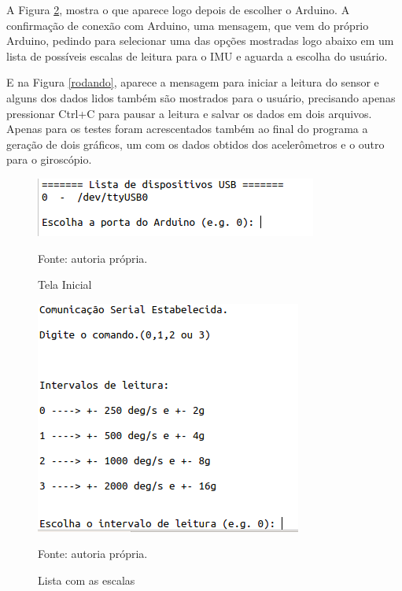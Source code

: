	A Figura \ref{lista_ranges}, mostra o que aparece logo depois de escolher o Arduino. A confirmação de conexão com Arduino, uma mensagem, que vem do próprio Arduino, pedindo para selecionar uma das opções mostradas logo abaixo em um lista de possíveis escalas de leitura para o IMU e aguarda a escolha do usuário.
	
	E na Figura \ref{rodando}, aparece a mensagem para iniciar a leitura do sensor e alguns dos dados lidos também são mostrados para o usuário, precisando apenas pressionar Ctrl+C para pausar a leitura e salvar os dados em dois arquivos. Apenas para os testes foram acrescentados também ao final do programa a geração de dois gráficos, um com os dados obtidos dos acelerômetros e o outro para o giroscópio. 
	 	
	 	\begin{figure}[h]
	 		\centering
	 		\includegraphics[keepaspectratio=true,scale=0.6]{figuras/tela_inicial.png}
	 		\caption{Tela Inicial}
	 		Fonte: autoria própria. 
	 		\label{tela_inicial}	
	 	\end{figure}
	
	\begin{figure}[h]
		\centering
		\includegraphics[keepaspectratio=true,scale=0.6]{figuras/lista_ranges.png}
		\caption{Lista com as escalas}
		Fonte: autoria própria. 
		\label{lista_ranges}	
	\end{figure}
	
